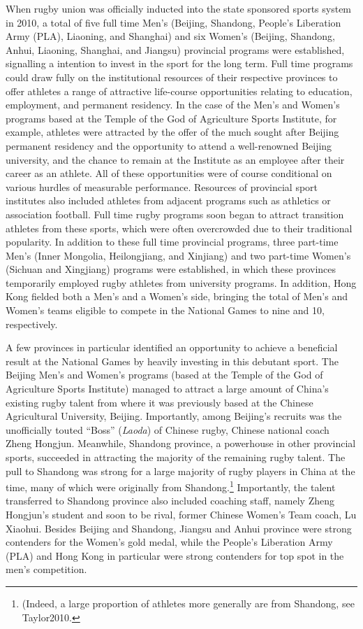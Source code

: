 {When rugby union was officially inducted into the state sponsored sports system in 2010, a total of five full time Men's (Beijing, Shandong, People's Liberation Army (PLA), Liaoning, and Shanghai) and six Women's (Beijing, Shandong, Anhui, Liaoning, Shanghai, and Jiangsu) provincial programs were established, signalling a intention to invest in the sport for the long term.  Full time programs could draw fully on the institutional resources of their respective provinces to offer athletes a range of attractive life-course opportunities relating to education, employment, and permanent residency.  In the case of the Men's and Women's programs based at the Temple of the God of Agriculture Sports Institute, for example, athletes were attracted by the offer of the much sought after Beijing permanent residency and the opportunity to attend a well-renowned Beijing university, and the chance to remain at the Institute as an employee after their career as an athlete.  All of these opportunities were of course conditional on various hurdles of measurable performance.  Resources of provincial sport institutes also included athletes from adjacent programs such as athletics or association football.  Full time rugby programs soon began to attract transition athletes from these sports, which were often overcrowded due to their traditional popularity.  In addition to these full time provincial programs, three part-time Men's (Inner Mongolia, Heilongjiang, and Xinjiang) and two part-time Women's (Sichuan and Xingjiang) programs were established, in which these provinces temporarily employed rugby athletes from university programs. In addition, Hong Kong fielded both a Men's and a Women's side, bringing the total of Men's and Women's teams eligible to compete in the National Games to nine and 10, respectively.

A few provinces in particular identified an opportunity to achieve a beneficial result at the National Games by heavily investing in this debutant sport.  The Beijing Men's and Women's programs (based at the Temple of the God of Agriculture Sports Institute) managed to attract a large amount of China's existing rugby talent from where it was previously based at the Chinese Agricultural University, Beijing.  Importantly, among Beijing's recruits was the unofficially touted ``Boss''  (\textit{Laoda}) of Chinese rugby, Chinese national coach Zheng Hongjun.  Meanwhile, Shandong province, a powerhouse in other provincial sports, succeeded in attracting the majority of the remaining rugby talent. The pull to Shandong was strong for a large majority of rugby players in China at the time, many of which were originally from Shandong.\footnote{(Indeed, a large proportion of athletes more generally are from Shandong, see Taylor2010.}  Importantly, the talent transferred to Shandong province also included coaching staff, namely Zheng Hongjun's student and soon to be rival, former Chinese Women's Team coach, Lu Xiaohui.  Besides Beijing and Shandong, Jiangsu and Anhui province were strong contenders for the Women's gold medal, while the People's Liberation Army (PLA) and Hong Kong in particular were strong contenders for top spot in the men's competition.



}
